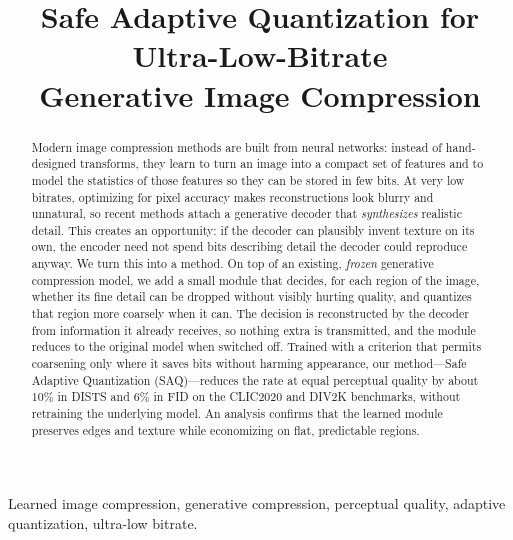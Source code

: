 \documentclass[conference]{IEEEtran}
\begin{document}
\title{Safe Adaptive Quantization for Ultra-Low-Bitrate\\ Generative Image Compression}

\author{
}

\maketitle

\begin{abstract}
Modern image compression methods are built from neural networks: instead of
hand-designed transforms, they learn to turn an image into a compact set of
features and to model the statistics of those features so they can be stored in
few bits. At very low bitrates, optimizing for pixel accuracy makes
reconstructions look blurry and unnatural, so recent methods attach a generative
decoder that \emph{synthesizes} realistic detail. This creates an opportunity: if
the decoder can plausibly invent texture on its own, the encoder need not spend
bits describing detail the decoder could reproduce anyway. We turn this into a
method. On top of an existing, \emph{frozen} generative compression model, we add
a small module that decides, for each region of the image, whether its fine detail
can be dropped without visibly hurting quality, and quantizes that region more
coarsely when it can. The decision is reconstructed by the decoder from
information it already receives, so nothing extra is transmitted, and the module
reduces to the original model when switched off. Trained with a criterion that
permits coarsening only where it saves bits without harming appearance, our
method---Safe Adaptive Quantization (SAQ)---reduces the rate at equal perceptual
quality by about $10\%$ in DISTS and $6\%$ in FID on the CLIC2020 and DIV2K
benchmarks, without retraining the underlying model. An analysis confirms that the
learned module preserves edges and texture while economizing on flat, predictable
regions.
\end{abstract}

\begin{IEEEkeywords}
Learned image compression, generative compression, perceptual quality, adaptive
quantization, ultra-low bitrate.
\end{IEEEkeywords}
\end{document}
